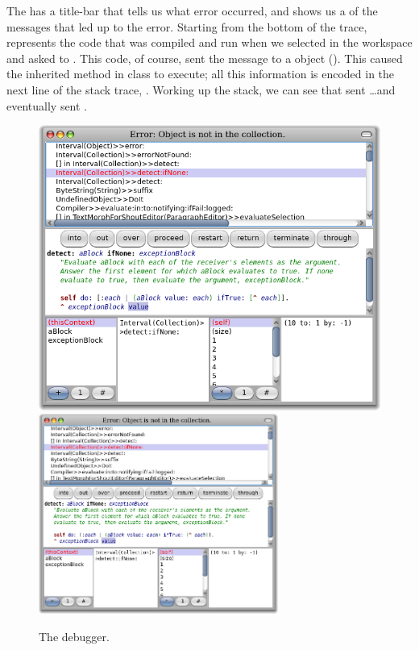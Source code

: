 \documentclass[a4paper,10pt,twoside]{book}
\begin{document}
The  has a title-bar that tells us what error occurred, and shows us a  of the messages that led up to the error. 
Starting from the bottom of the trace,  represents the code that was compiled and run when we selected  in the workspace and asked \pharo to .
This code, of course, sent the message  to a  object (). 
This caused the inherited  method in class  to execute; all this information is encoded in the next line of the stack trace, .  
Working up the stack, we can see that  sent \ldots and eventually  sent .

\begin{figure}[btp]
	\begin{center}
	\ifluluelse
		{\includegraphics[width=\textwidth]{debuggerDetectIfNone}}
		{\includegraphics[width=0.7\textwidth]{debuggerDetectIfNone}}
	\end{center}
	\caption{The debugger.}
\end{figure}
\end{document}
